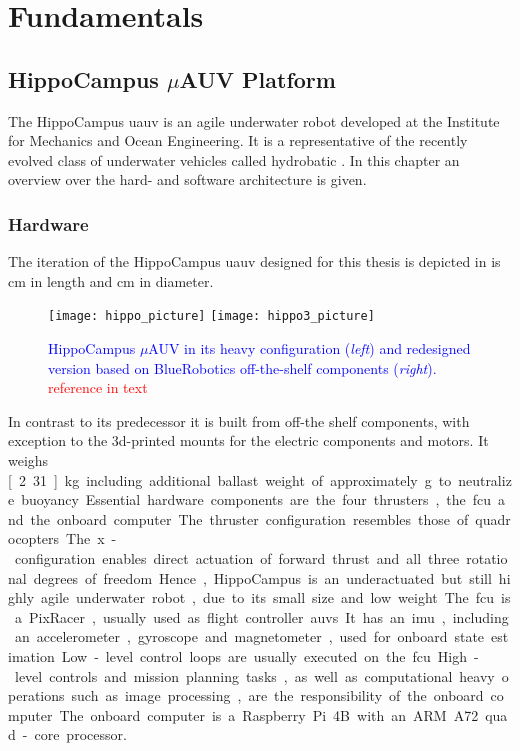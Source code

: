 \chapter{Fundamentals}\label{chap:fundamentals}

\section{HippoCampus $\mu$AUV Platform}\label{sec:hippo-platform}

The HippoCampus \ac{uauv} is an agile underwater robot developed at the Institute for Mechanics and Ocean Engineering. It is a representative of the recently evolved class of underwater vehicles called hydrobatic \cite{hydrobatic}. In this chapter an overview over the hard- and software architecture is given.

\subsection{Hardware}
The iteration of the HippoCampus \ac{uauv} designed for this thesis is depicted in  is \unit[30]{cm} in length and \unit[8]{cm} in diameter.
\begin{figure}[h!]
    \centering
    \texttt{[image: hippo\_picture]}
    \quad\quad
    \texttt{[image: hippo3\_picture]}
    \caption{\textcolor{blue}{HippoCampus $\mu$AUV in its heavy configuration (\textit{left}) and redesigned version based on BlueRobotics off-the-shelf components (\textit{right}).} \textcolor{red}{reference in text}}
    \label{fig:new-vehicle-design}
\end{figure}
In contrast to its predecessor it is built from off-the shelf components, with exception to the 3d-printed mounts for the electric components and motors. It weighs \unit[2.31]{kg} including additional ballast weight of approximately \unit[150]{g} to neutralize buoyancy.

Essential hardware components are the four thrusters, the \ac{fcu} and the onboard computer. The thruster configuration resembles those of quadrocopters. The x-configuration enables direct actuation of forward thrust and all three rotational degrees of freedom. Hence, HippoCampus is an underactuated but still highly agile underwater robot, due to its small size and low weight.

The \ac{fcu} is a PixRacer, usually used as flight controller \acp{auv}. It has an \ac{imu}, including an accelerometer, gyroscope and magnetometer, used for onboard state estimation. Low-level control loops are usually executed on the \ac{fcu}. High-level controls and mission planning tasks, as well as computational heavy operations such as image processing, are the responsibility of the onboard computer. The onboard computer is a Raspberry Pi 4B with an ARM A72 quad-core processor.


